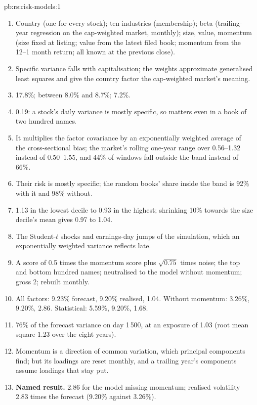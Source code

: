 \begin{solution}{pb:rs:risk-models:1}
\begin{enumerate}
\item Country (one for every stock); ten industries (membership); beta (trailing-year regression on the cap-weighted market, monthly); size, value, momentum (size fixed at listing; value from the latest filed book; momentum from the 12--1 month return; all known at the previous close).
\item Specific variance falls with capitalisation; the weights approximate generalised least squares and give the country factor the cap-weighted market's meaning.
\item 17.8\%; between 8.0\% and 8.7\%; 7.2\%.
\item 0.19: a stock's daily variance is mostly specific, so  matters even in a book of two hundred names.
\item It multiplies the factor covariance by an exponentially weighted average of the cross-sectional bias; the market's rolling one-year  range
over 0.56--1.32 instead of 0.50--1.55, and 44\% of windows fall outside the band instead of 66\%.
\item Their risk is mostly specific; the random books' share inside the band is 92\% with it and 98\% without.
\item 1.13 in the lowest decile to 0.93 in the highest; shrinking 10\% towards the size decile's mean gives 0.97 to 1.04.
\item The Student-$t$ shocks and earnings-day jumps of the simulation, which an exponentially weighted variance reflects late.
\item A score of 0.5 times the momentum score plus $\sqrt{0.75}$ times noise; the top and bottom hundred names; neutralised to the model without momentum;
gross 2; rebuilt monthly.
\item All factors: 9.23\% forecast, 9.20\% realised, 1.04. Without momentum: 3.26\%, 9.20\%, 2.86. Statistical: 5.59\%, 9.20\%, 1.68.
\item 76\% of the forecast variance on day 1\,500, at an exposure of 1.03 (root mean square 1.23 over the eight years).
\item Momentum is a direction of common variation, which principal components find; but its loadings are reset monthly, and a trailing year's components
assume loadings that stay put.
\item \textbf{Named result.}  2.86 for the model missing momentum; realised volatility 2.83 times the forecast (9.20\% against 3.26\%).

\end{enumerate}
\end{solution}
